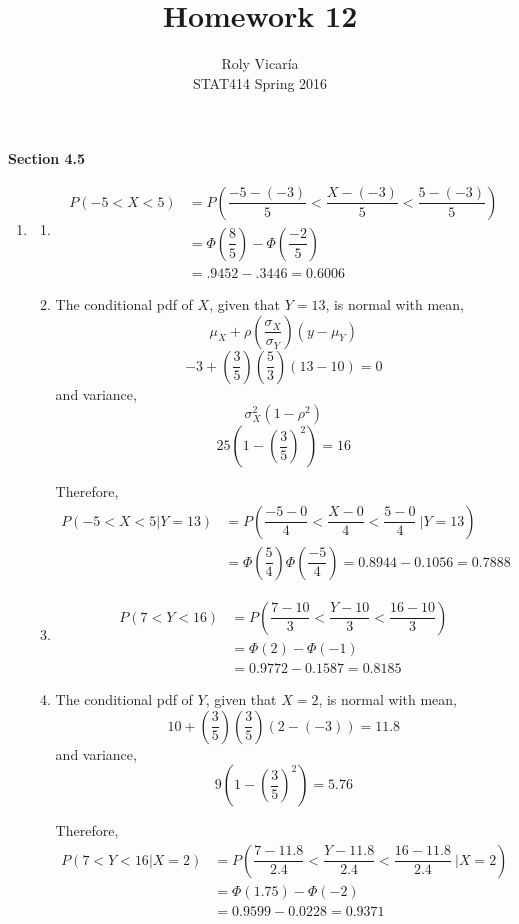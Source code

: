\documentclass{article}
\title{Homework 12}
\author{Roly Vicar\'ia \\ STAT414 Spring 2016}
\newcommand\mfrac[2]{\left(\dfrac{#1}{#2}\right)}
\begin{document}
    
    \maketitle
    
    \textbf{Section 4.5}
    \begin{enumerate}
     \item 
      \begin{enumerate}
       \item
	\begin{align*}
	 P(-5 < X < 5) &= P\left(\dfrac{-5 - (-3)}{5} < \dfrac{X - (-3)}{5} < \dfrac{5 - (-3)}{5}\right) \\
	  &= \Phi\mfrac{8}{5} - \Phi\mfrac{-2}{5} \\
	  &= .9452 - .3446 = 0.6006
	\end{align*}
       
       \item
	The conditional pdf of $X$, given that $Y=13$, is normal with mean, 
	$$\mu_X + \rho \mfrac{\sigma_X}{\sigma_Y}(y - \mu_Y)$$
	$$-3 + \mfrac{3}{5}\mfrac{5}{3}(13 - 10) = 0$$
	and variance,
	$$\sigma_X^2(1 - \rho^2)$$
	$$25\left(1 - \mfrac{3}{5}^2\right) = 16$$
	
	Therefore,
	\begin{align*}
	 P(-5 < X < 5|Y=13) &= P\left(\dfrac{-5 - 0}{4} < \dfrac{X-0}{4} < \dfrac{5-0}{4}\ \Big|Y=13\right) \\
	  &= \Phi\mfrac{5}{4} \Phi\mfrac{-5}{4} = 0.8944 - 0.1056 = 0.7888
	\end{align*}
       
       \item
	\begin{align*}
	 P(7 < Y < 16) &= P\left(\dfrac{7-10}{3} < \dfrac{Y-10}{3} < \dfrac{16-10}{3}\right) \\
	  &= \Phi(2) - \Phi(-1) \\
	  &= 0.9772 - 0.1587 = 0.8185
	\end{align*}
       
       \item
	The conditional pdf of $Y$, given that $X=2$, is normal with mean,
	$$10 + \mfrac{3}{5}\mfrac{3}{5}(2 - (-3)) = 11.8$$
	and variance,
	$$9\left(1 - \mfrac{3}{5}^2\right) = 5.76$$
	
	Therefore,
	\begin{align*}
	 P(7<Y<16 | X=2) &= P\left(\dfrac{7-11.8}{2.4} < \dfrac{Y-11.8}{2.4} < \dfrac{16-11.8}{2.4}\ \Big|X=2\right) \\
	  &= \Phi(1.75) - \Phi(-2) \\
	  &= 0.9599 - 0.0228 = 0.9371
	\end{align*}
      \end{enumerate}


\end{enumerate}
\end{document}

